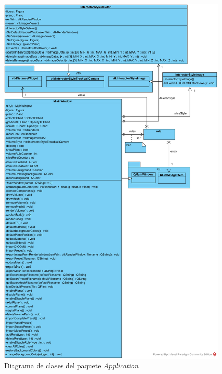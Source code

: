 \begin{figure}[H]
	\centering
	\includegraphics[width=11.25cm]{imagenes/diagramas/application}
	\caption{Diagrama de clases del paquete \textit{Application}}
	\label{fig:diagrama_clases_application}
\end{figure}